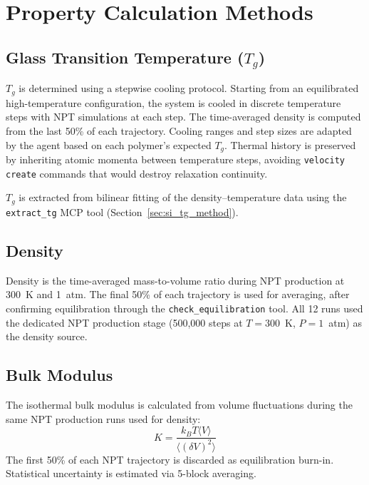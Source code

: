 \documentclass[journal=acsami,manuscript=suppinfo]{achemso}
\begin{document}
\section{Property Calculation Methods}
\label{sec:si_property_methods}

\subsection{Glass Transition Temperature ($T_g$)}

$T_g$ is determined using a stepwise cooling protocol.\cite{trag2019gaff2mod,strobl2007physics}
Starting from an equilibrated high-temperature configuration, the system is cooled in discrete temperature steps with NPT simulations at each step.
The time-averaged density is computed from the last 50\% of each trajectory.
Cooling ranges and step sizes are adapted by the agent based on each polymer's expected $T_g$.
Thermal history is preserved by inheriting atomic momenta between temperature steps, avoiding \texttt{velocity create} commands that would destroy relaxation continuity.

$T_g$ is extracted from bilinear fitting of the density--temperature data using the \texttt{extract\_tg} MCP tool (Section~\ref{sec:si_tg_method}).

\subsection{Density}

Density is the time-averaged mass-to-volume ratio during NPT production at 300~K and 1~atm.
The final 50\% of each trajectory is used for averaging, after confirming equilibration through the \texttt{check\_equilibration} tool.
All 12 runs used the dedicated NPT production stage (500{,}000 steps at $T = 300$~K, $P = 1$~atm) as the density source.

\subsection{Bulk Modulus}

The isothermal bulk modulus is calculated from volume fluctuations\cite{allen2017computer} during the same NPT production runs used for density:
\begin{equation}
K = \frac{k_B T \langle V \rangle}{\langle (\delta V)^2 \rangle}
\end{equation}
The first 50\% of each NPT trajectory is discarded as equilibration burn-in.
Statistical uncertainty is estimated via 5-block averaging.
\end{document}
